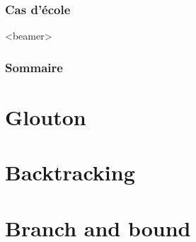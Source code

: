 \documentclass{beamer}
\begin{document}
\begin{frame}
  \frametitle{Cas d'école}

  
\end{frame}

\begin{frame}<beamer>
  \frametitle{Sommaire}
  \tableofcontents[currentsection]
\end{frame}

\section{Glouton}

\section{Backtracking}

\section{Branch and bound}



  
\end{document}
